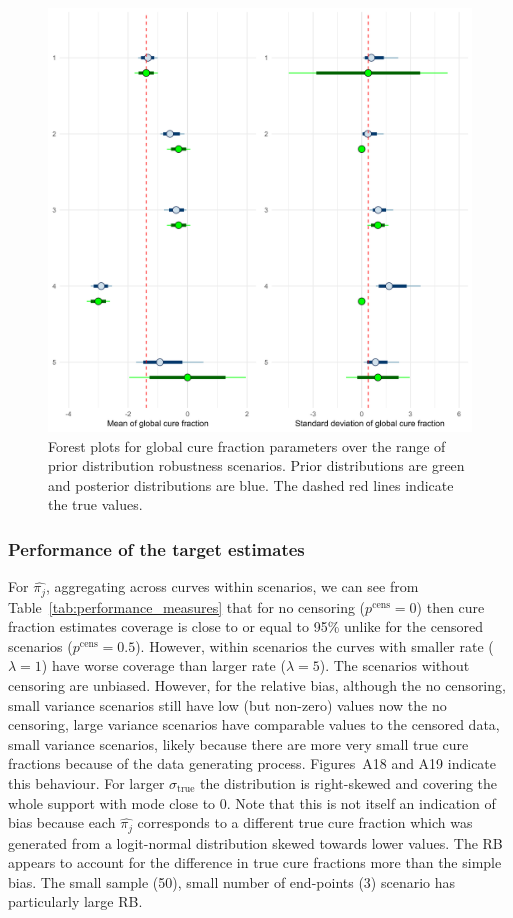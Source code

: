 \documentclass[AMA,STIX1COL]{WileyNJD-v2}
\begin{document}
\begin{figure}[!ht]
\centering
\includegraphics[width=0.8\linewidth]{posterior_forest_plot_global_cf.png}
\caption{\label{fig:posterior_forest_plot_global_cf} Forest plots for global cure fraction parameters over the range of prior distribution robustness scenarios. Prior distributions are green and posterior distributions are blue. The dashed red lines indicate the true values.}
\end{figure}

\subsubsection{Performance of the target estimates}
For $\widehat{\pi_j}$, aggregating across curves within scenarios, we can see from Table~\ref{tab:performance_measures} that for no censoring ($p^{\text{cens}} = 0$) then cure fraction estimates coverage is close to or equal to 95\% unlike for the censored scenarios ($p^{\text{cens}} = 0.5$). However, within scenarios the curves with smaller rate ($\lambda=1$) have worse coverage than larger rate ($\lambda=5$). The scenarios without censoring are unbiased. However, for the relative bias, although the no censoring, small variance scenarios still have low (but non-zero) values now the no censoring, large variance scenarios have comparable values to the censored data, small variance scenarios, likely because there are more very small true cure fractions because of the data generating process.
Figures~A18 and A19 indicate this behaviour. For larger $\sigma_{\text{true}}$ the distribution is right-skewed and covering the whole support with mode close to 0. Note that this is not itself an indication of bias because each $\widehat{\pi_j}$ corresponds to a different true cure fraction which was generated from a logit-normal distribution skewed towards lower values. The RB appears to account for the difference in true cure fractions more than the simple bias. The small sample (50), small number of end-points (3) scenario has particularly large RB.
\end{document}
